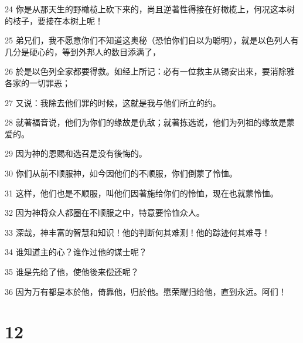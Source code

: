 \par 24 你是从那天生的野橄榄上砍下来的，尚且逆著性得接在好橄榄上，何况这本树的枝子，要接在本树上呢！
\par 25 弟兄们，我不愿意你们不知道这奥秘（恐怕你们自以为聪明），就是以色列人有几分是硬心的，等到外邦人的数目添满了，
\par 26 於是以色列全家都要得救。如经上所记：必有一位救主从锡安出来，要消除雅各家的一切罪恶；
\par 27 又说：我除去他们罪的时候，这就是我与他们所立的约。
\par 28 就著福音说，他们为你们的缘故是仇敌；就著拣选说，他们为列祖的缘故是蒙爱的。
\par 29 因为神的恩赐和选召是没有後悔的。
\par 30 你们从前不顺服神，如今因他们的不顺服，你们倒蒙了怜恤。
\par 31 这样，他们也是不顺服，叫他们因著施给你们的怜恤，现在也就蒙怜恤。
\par 32 因为神将众人都圈在不顺服之中，特意要怜恤众人。
\par 33 深哉，神丰富的智慧和知识！他的判断何其难测！他的踪迹何其难寻！
\par 34 谁知道主的心？谁作过他的谋士呢？
\par 35 谁是先给了他，使他後来偿还呢？
\par 36 因为万有都是本於他，倚靠他，归於他。愿荣耀归给他，直到永远。阿们！

\chapter{12}

